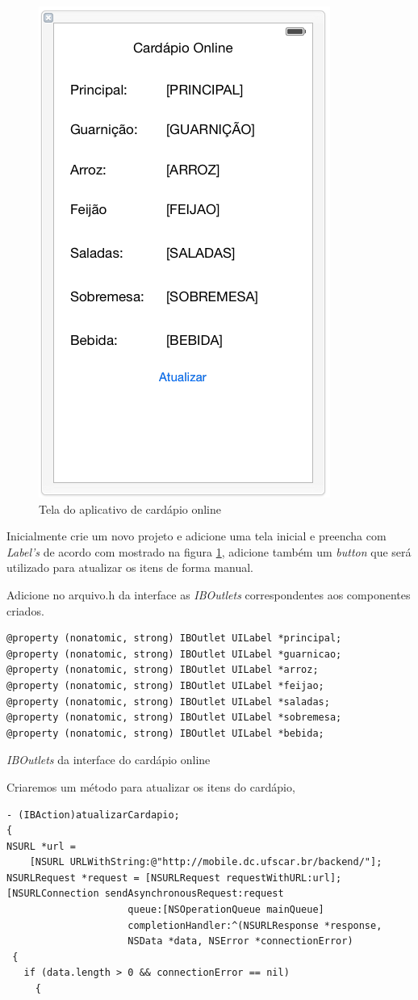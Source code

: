 \documentclass[a4paper,12pt,brazil,doubleside]{book}
\begin{document}
\begin{singlespace}
\begin{figure}[H]
  \centering
  \includegraphics[width=.45\textwidth]{figuras/5/APP_Cardapio1.png}
  \caption{Tela do aplicativo de cardápio online}
  \label{fig:app_cardapio1}
\end{figure}

Inicialmente crie um novo projeto e adicione uma tela inicial e preencha com \emph{Label's} de acordo com mostrado na figura \ref{fig:app_cardapio1}, adicione também um \emph{button} que será utilizado para atualizar os itens de forma manual.

Adicione no arquivo.h da interface as \emph{IBOutlets} correspondentes aos componentes criados.

\begin{listing}[H]
\begin{verbatim}
@property (nonatomic, strong) IBOutlet UILabel *principal;
@property (nonatomic, strong) IBOutlet UILabel *guarnicao;
@property (nonatomic, strong) IBOutlet UILabel *arroz;
@property (nonatomic, strong) IBOutlet UILabel *feijao;
@property (nonatomic, strong) IBOutlet UILabel *saladas;
@property (nonatomic, strong) IBOutlet UILabel *sobremesa;
@property (nonatomic, strong) IBOutlet UILabel *bebida;
\end{verbatim}
\caption{\emph{IBOutlets} da interface do cardápio online}
\end{listing}

Criaremos um método para atualizar os itens do cardápio,

\begin{listing}[H]
\begin{verbatim}
- (IBAction)atualizarCardapio;
{
NSURL *url = 
	[NSURL URLWithString:@"http://mobile.dc.ufscar.br/backend/"];
NSURLRequest *request = [NSURLRequest requestWithURL:url];
[NSURLConnection sendAsynchronousRequest:request
                     queue:[NSOperationQueue mainQueue]
                     completionHandler:^(NSURLResponse *response,
                     NSData *data, NSError *connectionError)
 {
   if (data.length > 0 && connectionError == nil)
     {


\end{verbatim}
\end{listing}
\end{singlespace}
\end{document}
